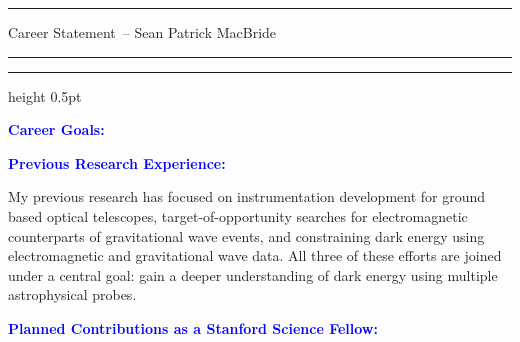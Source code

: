 \documentclass[11pt]{article}
\newcommand{\yourname}{Sean Patrick MacBride}
\newcommand{\soptitle}{Career Statement}
\newcommand{\statement}[1]{\par\medskip
  \textcolor{blue}{\textbf{#1:}}%
}
\begin{document}
\hrule
\begin{center}
    \Large\soptitle\ -- \yourname
\end{center}
\vspace{0pt}
\hrule
\vspace{0.5pt}
\hrule height 0.5pt
\vspace{3pt}

\normalsize
\thispagestyle{plain}
\statement{Career Goals}

\statement{Previous Research Experience}
My previous research has focused on instrumentation development for ground based optical telescopes, target-of-opportunity searches for electromagnetic counterparts of gravitational wave events, and constraining dark energy using electromagnetic and gravitational wave data. All three of these efforts are joined under a central goal: gain a deeper understanding of dark energy using multiple astrophysical probes.



\statement{Planned Contributions as a Stanford Science Fellow}

\end{document}

